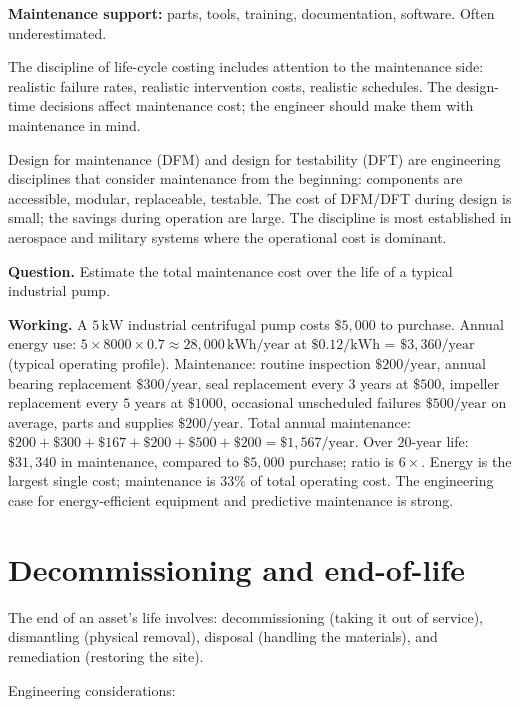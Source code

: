 \textbf{Maintenance support:} parts, tools, training, documentation, software. Often underestimated.

The discipline of life-cycle costing includes attention to the maintenance side: realistic failure rates, realistic intervention costs, realistic schedules. The design-time decisions affect maintenance cost; the engineer should make them with maintenance in mind.

Design for maintenance (DFM) and design for testability (DFT) are engineering disciplines that consider maintenance from the beginning: components are accessible, modular, replaceable, testable. The cost of DFM/DFT during design is small; the savings during operation are large. The discipline is most established in aerospace and military systems where the operational cost is dominant.

\begin{estimation}
\textbf{Question.} Estimate the total maintenance cost over the life of a typical industrial pump.

\textbf{Working.} A $5\,\text{kW}$ industrial centrifugal pump costs $\$5{,}000$ to purchase. Annual energy use: $5 \times 8000 \times 0.7 \approx 28{,}000\,\text{kWh/year}$ at $\$0.12/\text{kWh}$ = $\$3{,}360/\text{year}$ (typical operating profile). Maintenance: routine inspection $\$200/\text{year}$, annual bearing replacement $\$300/\text{year}$, seal replacement every $3$ years at $\$500$, impeller replacement every $5$ years at $\$1000$, occasional unscheduled failures $\$500/\text{year}$ on average, parts and supplies $\$200/\text{year}$. Total annual maintenance: $\$200 + \$300 + \$167 + \$200 + \$500 + \$200 = \$1{,}567/\text{year}$. Over $20$-year life: $\$31{,}340$ in maintenance, compared to $\$5{,}000$ purchase; ratio is $6\times$. Energy is the largest single cost; maintenance is $33\%$ of total operating cost. The engineering case for energy-efficient equipment and predictive maintenance is strong.
\end{estimation}

\section{Decommissioning and end-of-life}

The end of an asset's life involves: decommissioning (taking it out of service), dismantling (physical removal), disposal (handling the materials), and remediation (restoring the site).

Engineering considerations:

